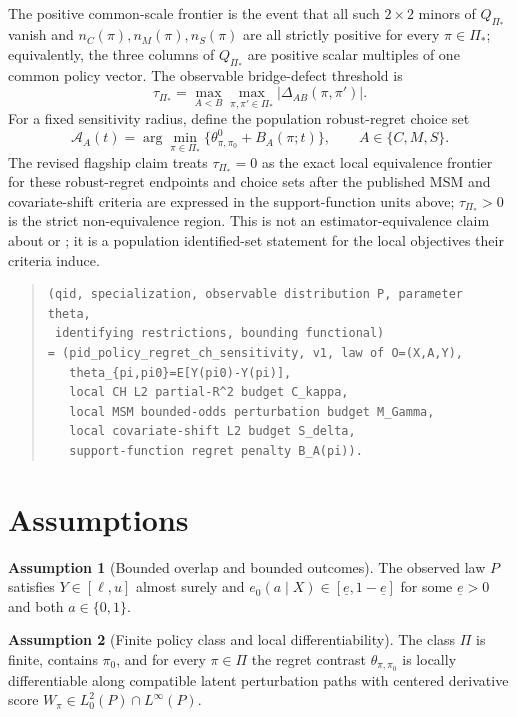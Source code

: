 \documentclass[11pt]{article}
\theoremstyle{definition}
\newtheorem{assumption}{Assumption}
\theoremstyle{plain}
\theoremstyle{remark}
\begin{document}
The positive common-scale frontier is the event that all such $2\times2$ minors of $Q_{\Pi_\ast}$ vanish and $n_C(\pi),n_M(\pi),n_S(\pi)$ are all strictly positive for every $\pi\in\Pi_\ast$; equivalently, the three columns of $Q_{\Pi_\ast}$ are positive scalar multiples of one common policy vector.  The observable bridge-defect threshold is
\[
  \tau_{\Pi_\ast}=\max_{A<B}\max_{\pi,\pi'\in\Pi_\ast}|\Delta_{AB}(\pi,\pi')|.
\]
For a fixed sensitivity radius, define the population robust-regret choice set
\[
  \mathcal A_A(t)=\arg\min_{\pi\in\Pi_\ast}\{\theta^0_{\pi,\pi_0}+B_A(\pi;t)\},
  \qquad A\in\{C,M,S\}.
\]
The revised flagship claim treats $\tau_{\Pi_\ast}=0$ as the exact local equivalence frontier for these robust-regret endpoints and choice sets after the published MSM and covariate-shift criteria are expressed in the support-function units above; $\tau_{\Pi_\ast}>0$ is the strict non-equivalence region.  This is not an estimator-equivalence claim about \citet{JinXuZhengZhou2025} or \citet{AdjahoChristensen2025}; it is a population identified-set statement for the local objectives their criteria induce.

\begin{quote}
\begin{verbatim}
(qid, specialization, observable distribution P, parameter theta,
 identifying restrictions, bounding functional)
= (pid_policy_regret_ch_sensitivity, v1, law of O=(X,A,Y),
   theta_{pi,pi0}=E[Y(pi0)-Y(pi)],
   local CH L2 partial-R^2 budget C_kappa,
   local MSM bounded-odds perturbation budget M_Gamma,
   local covariate-shift L2 budget S_delta,
   support-function regret penalty B_A(pi)).
\end{verbatim}
\end{quote}

\section{Assumptions}
\begin{assumption}[Bounded overlap and bounded outcomes]\label{ass:bounded-overlap}
The observed law $P$ satisfies $Y\in[\ell,u]$ almost surely and $e_0(a\mid X)\in[\underline e,1-\underline e]$ for some $\underline e>0$ and both $a\in\{0,1\}$.
\end{assumption}

\begin{assumption}[Finite policy class and local differentiability]\label{ass:finite-local}
The class $\Pi$ is finite, contains $\pi_0$, and for every $\pi\in\Pi$ the regret contrast $\theta_{\pi,\pi_0}$ is locally differentiable along compatible latent perturbation paths with centered derivative score $W_{\pi}\in L^2_0(P)\cap L^{\infty}(P)$.
\end{assumption}
\end{document}
